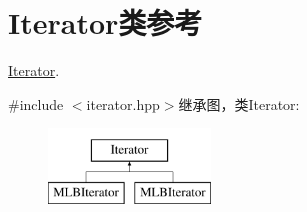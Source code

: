 \hypertarget{classIterator}{
\section{Iterator类参考}
\label{classIterator}
}


\hyperlink{classIterator}{Iterator}.  


{\ttfamily \#include $<$iterator.hpp$>$}继承图，类Iterator:\begin{figure}[H]
\begin{center}
\leavevmode
\includegraphics[height=2cm]{classIterator}
\end{center}
\end{figure}
